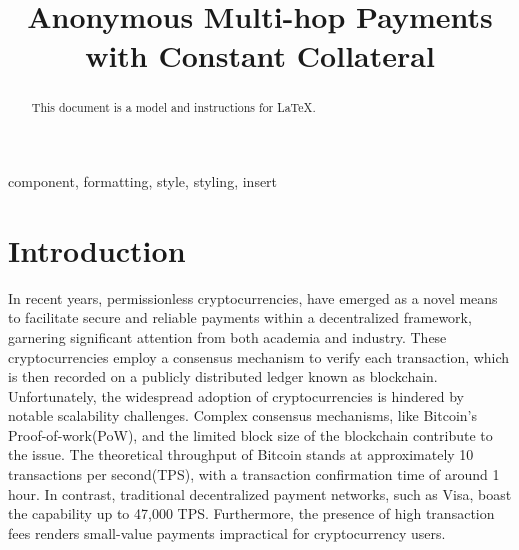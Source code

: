 \documentclass[conference]{IEEEtran}
\begin{document}
\title{Anonymous Multi-hop Payments with Constant Collateral}

\author{
\and
{}
}

\maketitle

\begin{abstract}
This document is a model and instructions for \LaTeX.
\end{abstract}

\begin{IEEEkeywords}
component, formatting, style, styling, insert
\end{IEEEkeywords}

\section{Introduction}
In recent years, permissionless cryptocurrencies, have emerged as a novel means to facilitate secure
and reliable payments within a decentralized framework, garnering significant attention from both academia 
and industry. These cryptocurrencies employ a consensus mechanism to verify each transaction, which is
then recorded on a publicly distributed ledger known as blockchain. Unfortunately, 
the widespread adoption of cryptocurrencies is hindered by notable scalability challenges. 
Complex consensus mechanisms, like Bitcoin's Proof-of-work(PoW), and the limited block size of the 
blockchain contribute to the issue. The theoretical throughput of Bitcoin stands at approximately 10 transactions 
per second(TPS), with a transaction confirmation time of around 1 hour. In contrast, traditional decentralized 
payment networks, such as Visa, boast the capability up to 47,000 TPS. Furthermore, the presence of high 
transaction fees renders small-value payments impractical for cryptocurrency users. 
\end{document}

